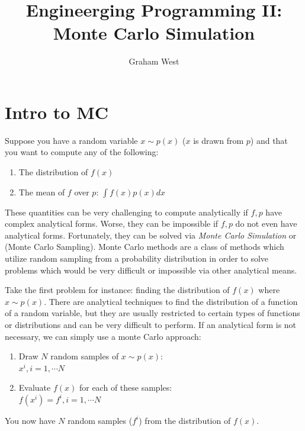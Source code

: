 \documentclass{article}
\begin{document}
\title{Engineerging Programming II: \\ Monte Carlo Simulation}
\author{Graham West}
\date{}

\maketitle

\large

\tableofcontents


\section{Intro to MC}

Suppose you have a random variable $x \sim p(x)$ ($x$ is drawn from $p$) and that you want to compute any of the following:
\begin{enumerate}
	\item The distribution of $f(x)$
	\item The mean of $f$ over $p$: $\int f(x) p(x) dx$
\end{enumerate}
These quantities can be very challenging to compute analytically if $f,p$ have complex analytical forms. Worse, they can be impossible if $f,p$ do not even have analytical forms. Fortunately, they can be solved via \emph{Monte Carlo Simulation} or (Monte Carlo Sampling). Monte Carlo methods are a class of methods which utilize random sampling from a probability distribution in order to solve problems which would be very difficult or impossible via other analytical means.

Take the first problem for instance: finding the distribution of $f(x)$ where $x \sim p(x)$. There are analytical techniques to find the distribution of a function of a random variable, but they are usually restricted to certain types of functions or distributions and can be very difficult to perform. If an analytical form is not necessary, we can simply use a monte Carlo approach:
\begin{enumerate}
	\item Draw $N$ random samples of $x \sim p(x)$:
			\\ $x^i, i = 1, \cdots N$
	\item Evaluate $f(x)$ for each of these samples:
			\\ $f(x^i) = f^i, i = 1, \cdots N$
\end{enumerate}
You now have $N$ random samples ($f^i$) from the distribution of $f(x)$.
\end{document}
